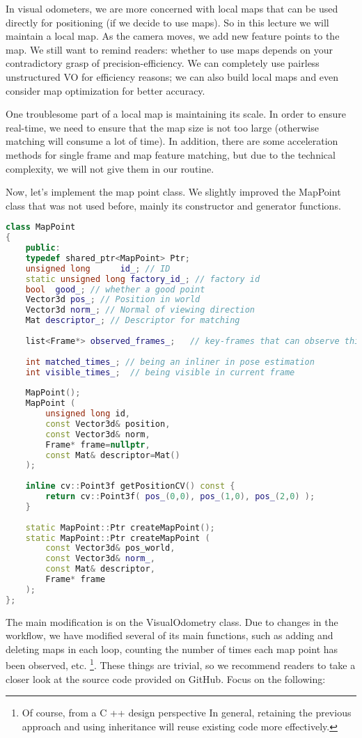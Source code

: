 In visual odometers, we are more concerned with local maps that can be used directly for positioning (if we decide to use maps). So in this lecture we will maintain a local map. As the camera moves, we add new feature points to the map. We still want to remind readers: whether to use maps depends on your contradictory grasp of precision-efficiency. We can completely use pairless unstructured VO for efficiency reasons; we can also build local maps and even consider map optimization for better accuracy.

One troublesome part of a local map is maintaining its scale. In order to ensure real-time, we need to ensure that the map size is not too large (otherwise matching will consume a lot of time). In addition, there are some acceleration methods for single frame and map feature matching, but due to the technical complexity, we will not give them in our routine.

Now, let's implement the map point class. We slightly improved the MapPoint class that was not used before, mainly its constructor and generator functions.
\begin{lstlisting}[language=c++,caption=slambook/project/0.4/include/myslam/mappoint.h]
class MapPoint
{
	public:
	typedef shared_ptr<MapPoint> Ptr;
	unsigned long      id_; // ID
	static unsigned long factory_id_; // factory id
	bool  good_; // whether a good point 
	Vector3d pos_; // Position in world
	Vector3d norm_; // Normal of viewing direction 
	Mat descriptor_; // Descriptor for matching 
	
	list<Frame*> observed_frames_;   // key-frames that can observe this point 
	
	int matched_times_; // being an inliner in pose estimation
	int visible_times_;  // being visible in current frame 
	
	MapPoint();
	MapPoint ( 
		unsigned long id, 
		const Vector3d& position, 
		const Vector3d& norm, 
		Frame* frame=nullptr, 
		const Mat& descriptor=Mat() 
	);
	
	inline cv::Point3f getPositionCV() const {
		return cv::Point3f( pos_(0,0), pos_(1,0), pos_(2,0) );
	}
	
	static MapPoint::Ptr createMapPoint();
	static MapPoint::Ptr createMapPoint ( 
		const Vector3d& pos_world, 
		const Vector3d& norm_,
		const Mat& descriptor,
		Frame* frame 
	);
};
\end{lstlisting}

The main modification is on the VisualOdometry class. Due to changes in the workflow, we have modified several of its main functions, such as adding and deleting maps in each loop, counting the number of times each map point has been observed, etc. \footnote{Of course, from a C ++ design perspective In general, retaining the previous approach and using inheritance will reuse existing code more effectively. }. These things are trivial, so we recommend readers to take a closer look at the source code provided on GitHub. Focus on the following:


